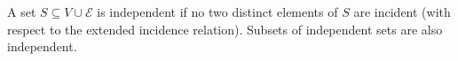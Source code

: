 A set $S \subseteq V \cup \mathcal{E}$ is independent if no two distinct elements of $S$ are incident (with respect to the extended incidence relation). Subsets of independent sets are also independent.